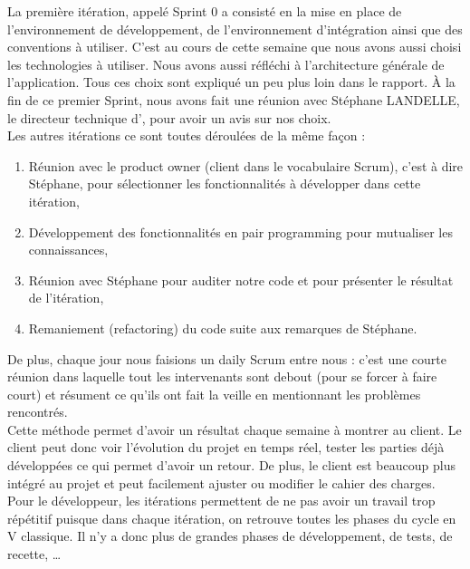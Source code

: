 La première itération, appelé Sprint 0 a consisté en la mise en place de l'environnement de développement, de l'environnement d'intégration ainsi que des conventions à utiliser. C'est au cours de cette semaine que nous avons aussi choisi les technologies à utiliser. Nous avons aussi réfléchi à l'architecture générale de l'application. Tous ces choix sont expliqué un peu plus loin dans le rapport. À la fin de ce premier Sprint, nous avons fait une réunion avec Stéphane LANDELLE, le directeur technique d'\ebi{}, pour avoir un avis sur nos choix.\\

Les autres itérations ce sont toutes déroulées de la même façon :
\begin{enumerate}
	\item Réunion avec le \flqq{}product owner\frqq{} (client dans le vocabulaire Scrum), c'est à dire Stéphane, pour sélectionner les fonctionnalités à développer dans cette itération,
	
	\item Développement des fonctionnalités en pair programming pour mutualiser les connaissances,
	
	\item Réunion avec Stéphane pour auditer notre code et pour présenter le résultat de l'itération,
	
	\item Remaniement (refactoring) du code suite aux remarques de Stéphane.\\
\end{enumerate}

De plus, chaque jour nous faisions un \flqq{}daily Scrum\frqq{} entre nous : c'est une courte réunion dans laquelle tout les intervenants sont debout (pour se forcer à faire court) et résument ce qu'ils ont fait la veille en mentionnant les problèmes rencontrés.\\

Cette méthode permet d'avoir un résultat chaque semaine à montrer au client. Le client peut donc voir l'évolution du projet en temps réel, tester les parties déjà développées ce qui permet d'avoir un retour. De plus, le client est beaucoup plus intégré au projet et peut facilement ajuster ou modifier le cahier des charges.\\

Pour le développeur, les itérations permettent de ne pas avoir un travail trop répétitif puisque dans chaque itération, on retrouve toutes les phases du cycle en V classique. Il n'y a donc plus de grandes phases de développement, de tests, de recette, \dots{}

